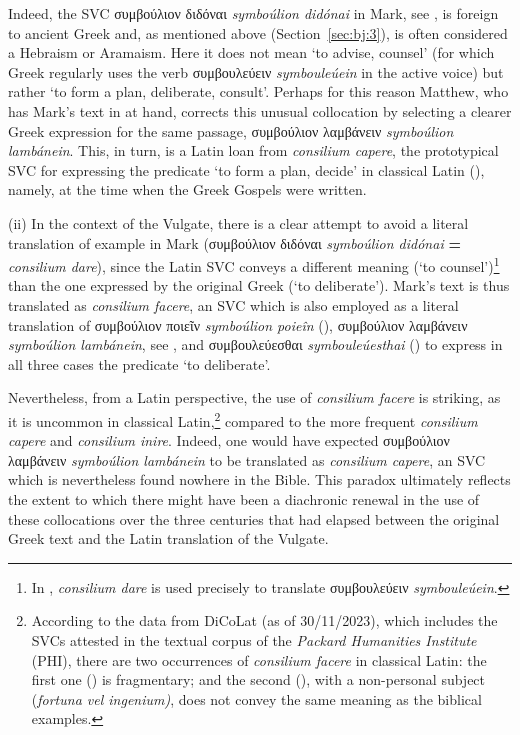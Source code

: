 \documentclass[output=paper,colorlinks,citecolor=brown]{langscibook}
\begin{document}

Indeed, the SVC συμβούλιον διδόναι \emph{symboúlion didónai} in Mark, see , is
foreign to ancient Greek and, as mentioned above (Section~\ref{sec:bj:3}), is often considered a Hebraism or
Aramaism. Here it does not mean `to advise, counsel' (for which Greek regularly uses the
verb συμβουλεύειν \emph{symbouleúein} in the active voice) but rather `to form a plan,
deliberate, consult'. Perhaps for this reason Matthew, who has Mark's text in
 at hand, corrects this unusual collocation by selecting a clearer Greek
expression for the same passage, συμβούλιον λαμβάνειν \emph{symboúlion lambánein}. This,
in turn, is a Latin loan from \emph{consilium capere}, the prototypical SVC for expressing
the predicate `to form a plan, decide' in classical Latin
(\cite{BañosJoséMiguel-2014631}), namely, at the time when the Greek Gospels were written.


(ii) In the context of the Vulgate, there is a clear attempt to avoid a literal
translation of example  in Mark (συμβούλιον διδόναι \emph{symboúlion
  didónai} \textbf{=} \emph{consilium dare}), since the Latin SVC conveys a different
meaning (`to counsel')\footnote{In , \emph{consilium dare} is used precisely to
  translate συμβουλεύειν \emph{symbouleúein}.} than the one expressed by the original
Greek (`to deliberate'). Mark's text is thus translated as \emph{consilium facere}, an SVC
which is also employed as a literal translation of συμβούλιον ποιεῖν \emph{symboúlion
  poieîn} (), συμβούλιον λαμβάνειν \emph{symboúlion lambánein}, see , and
συμβουλεύεσθαι \emph{symbouleúesthai} () to express in all three cases the
predicate `to deliberate'.

Nevertheless, from a Latin perspective, the use of \emph{consilium facere} is striking, as
it is uncommon in classical Latin,\footnote{According to the data from DiCoLat
  (as of 30/11/2023), which includes the SVCs attested in the textual corpus of the \textit{Packard
  Humanities Institute} (PHI), there are two occurrences of \emph{consilium facere} in
  classical Latin: the first one () is fragmentary; and the
  second (), with a non-personal subject (\emph{fortuna vel ingenium)}, does
  not convey the same meaning as the biblical examples.} compared to the more frequent
\emph{consilium capere} and \emph{consilium inire}. Indeed, one would have expected
συμβούλιον λαμβάνειν \emph{symboúlion lambánein} to be translated as \emph{consilium
  capere}, an SVC which is nevertheless found nowhere in the Bible. This paradox
ultimately reflects the extent to which there might have been a diachronic renewal in the
use of these collocations over the three centuries that had elapsed between the original
Greek text and the Latin translation of the Vulgate. 
\end{document}
